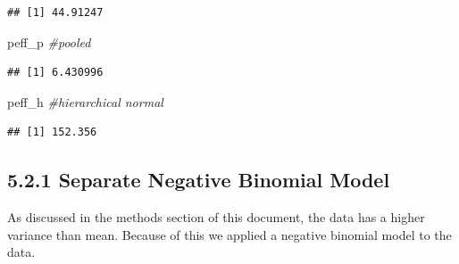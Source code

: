 \documentclass[]{article}
\newenvironment{Shaded}{\begin{snugshade}}{\end{snugshade}}
\newcommand{\KeywordTok}[1]{\textcolor[rgb]{0.13,0.29,0.53}{\textbf{#1}}}
\newcommand{\DecValTok}[1]{\textcolor[rgb]{0.00,0.00,0.81}{#1}}
\newcommand{\StringTok}[1]{\textcolor[rgb]{0.31,0.60,0.02}{#1}}
\newcommand{\CommentTok}[1]{\textcolor[rgb]{0.56,0.35,0.01}{\textit{#1}}}
\newcommand{\OperatorTok}[1]{\textcolor[rgb]{0.81,0.36,0.00}{\textbf{#1}}}
\newcommand{\NormalTok}[1]{#1}
\begin{document}
\begin{Shaded}
\end{Shaded}

\begin{verbatim}
## [1] 44.91247
\end{verbatim}

\begin{Shaded}
\begin{Highlighting}[]
\NormalTok{peff_p }\CommentTok{#pooled}
\end{Highlighting}
\end{Shaded}

\begin{verbatim}
## [1] 6.430996
\end{verbatim}

\begin{Shaded}
\begin{Highlighting}[]
\NormalTok{peff_h }\CommentTok{#hierarchical normal}
\end{Highlighting}
\end{Shaded}

\begin{verbatim}
## [1] 152.356
\end{verbatim}

\subsection{5.2.1 Separate Negative Binomial
Model}\label{separate-negative-binomial-model}

As discussed in the methods section of this document, the data has a
higher variance than mean. Because of this we applied a negative
binomial model to the data.
\end{document}
